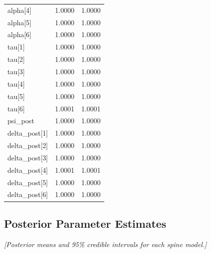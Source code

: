 \documentclass[
]{article}
\begin{document}
\begin{table}[!h]
{\begin{tabular}[t]{lrr}
\addlinespace
alpha[4] & 1.0000 & 1.0000\\
alpha[5] & 1.0000 & 1.0000\\
alpha[6] & 1.0000 & 1.0000\\
tau[1] & 1.0000 & 1.0000\\
tau[2] & 1.0000 & 1.0000\\
\addlinespace
tau[3] & 1.0000 & 1.0000\\
tau[4] & 1.0000 & 1.0000\\
tau[5] & 1.0000 & 1.0000\\
tau[6] & 1.0001 & 1.0001\\
psi\_post & 1.0000 & 1.0000\\
\addlinespace
delta\_post[1] & 1.0000 & 1.0000\\
delta\_post[2] & 1.0000 & 1.0000\\
delta\_post[3] & 1.0000 & 1.0000\\
delta\_post[4] & 1.0001 & 1.0001\\
delta\_post[5] & 1.0000 & 1.0000\\
\addlinespace
delta\_post[6] & 1.0000 & 1.0000\\
\bottomrule
\end{tabular}}
\end{table}

\subsection{Posterior Parameter Estimates}\label{app:posteriors}

\textit{[Posterior means and 95\% credible intervals for each spine model.]}
\end{document}
